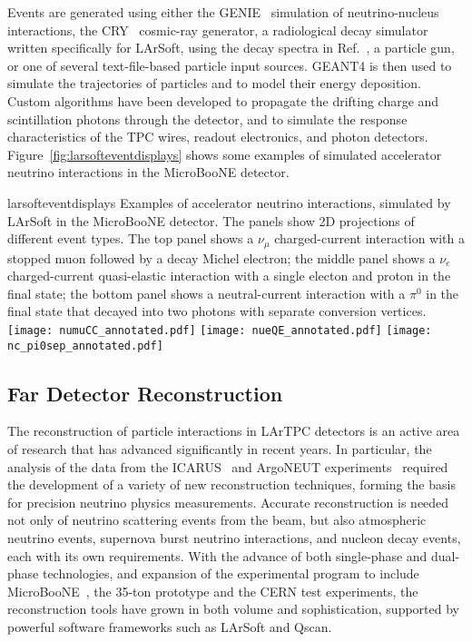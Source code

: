 Events are generated using either the GENIE~\cite{GENIE} simulation of 
neutrino-nucleus interactions, the CRY~\cite{Cosmic-CRY,Cosmic-CRY-protons,CRY-url} cosmic-ray generator, 
a radiological decay simulator written specifically for LArSoft, using the decay spectra
in Ref.~\cite{docdb-8797}, a particle gun, or one of several
text-file-based particle input sources. GEANT4 is then used to simulate the trajectories
of particles and to model their energy deposition.  
Custom algorithms have been developed to propagate the drifting charge
and scintillation photons through the detector, and to simulate the
response characteristics of the TPC wires, readout electronics, and photon detectors.
Figure~\ref{fig:larsofteventdisplays} shows some examples of simulated 
accelerator neutrino interactions in the MicroBooNE detector.

\begin{cdrfigure}{larsofteventdisplays}
{Examples of accelerator neutrino interactions, simulated by LArSoft in the 
MicroBooNE detector. The panels show 2D projections of different event types.
The top panel shows a $\nu_{\mu}$ charged-current interaction with a stopped muon followed
by a decay Michel electron; the middle panel shows a $\nu_{e}$ charged-current 
quasi-elastic interaction with a single electon and proton in the final state;
the bottom panel shows a neutral-current interaction with a $\pi^{0}$ in the final state
that decayed into two photons with separate conversion vertices.}
\texttt{[image: numuCC\_annotated.pdf]}
\texttt{[image: nueQE\_annotated.pdf]}
\texttt{[image: nc\_pi0sep\_annotated.pdf]}
\end{cdrfigure}

\subsection{Far Detector Reconstruction}
\label{sec:detectors-sc-physics-software-reconstruction-fd}

The reconstruction of particle interactions in LArTPC
detectors is an active area of research that has advanced significantly in recent years.
In particular, the analysis of the data from the ICARUS~\cite{Amerio:2004ze,icarus-url,ICARUS-pizero,Antonello:2012hu} 
and ArgoNEUT experiments~\cite{Adamson:2013/02/28tla,argoneut-url,Acciarri:2013met}
required the development of a variety of new reconstruction techniques,
forming the basis for precision neutrino physics measurements.
Accurate reconstruction is needed not only of neutrino scattering events from the beam, but also atmospheric neutrino events,
supernova burst neutrino interactions, and nucleon decay events, each with its own requirements.
With the advance of both single-phase and dual-phase technologies,
and expansion of the experimental program to include MicroBooNE~\cite{Chen:2007ae,microboone-url},
the 35-ton prototype and the CERN test experiments,
the reconstruction tools have grown in both volume and sophistication,
supported by powerful software frameworks such as LArSoft and Qscan.


